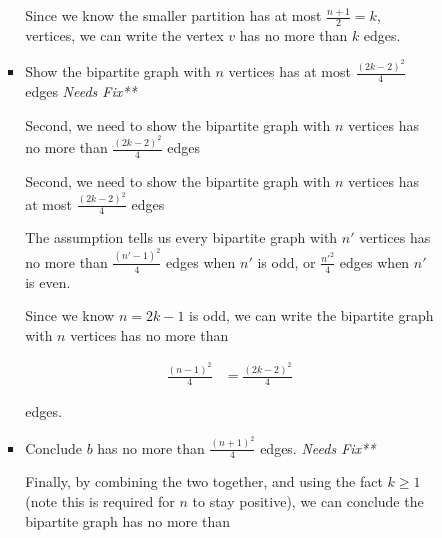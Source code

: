 \documentclass[12pt]{article}
\begin{document}
\begin{enumerate}[a.]
\begin{mdframed}
\begin{enumerate}[1.]
\begin{enumerate}[1.]
\begin{itemize}
\begin{mdframed}
                    \bigskip

                    Since we know the smaller partition has at most $\frac{n+1}{2} = k$,
                    vertices, we can write the vertex $v$ has no more than $k$ edges.

                    \end{mdframed}

                    \item Show the bipartite graph with $n$ vertices has
                    at most $\frac{(2k-2)^2}{4}$ edges \textit{Needs Fix**}

                    \bigskip

                    Second, we need to show the bipartite graph with $n$ vertices has
                    no more than $\frac{(2k-2)^2}{4}$ edges

                    \bigskip

                    \begin{mdframed}
                    Second, we need to show the bipartite graph with $n$ vertices has
                    at most $\frac{(2k-2)^2}{4}$ edges

                    \bigskip

                    The assumption tells us every bipartite graph with $n'$ vertices
                    has no more than $\frac{(n'-1)^2}{4}$ edges when $n'$ is odd, or
                    $\frac{n'^2}{4}$ edges when $n'$ is even.

                    \bigskip

                    Since we know $n = 2k - 1$ is odd, we can write the bipartite
                    graph with $n$ vertices has no more than

                    \begin{align}
                        \frac{(n-1)^2}{4} &= \frac{(2k-2)^2}{4}
                    \end{align}

                    edges.
                    \end{mdframed}

                    \item Conclude $b$ has no more than $\frac{(n+1)^2}{4}$ edges. \textit{Needs Fix**}

                    \begin{mdframed}
                    Finally, by combining the two together, and using the fact $k \geq 1$
                    (note this is required for $n$ to stay positive), we can
                    conclude the bipartite graph has no more than


\end{mdframed}
\end{itemize}
\end{enumerate}
\end{enumerate}
\end{mdframed}
\end{enumerate}
\end{document}

